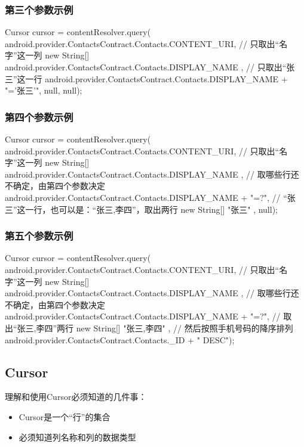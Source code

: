 \subsubsection[第三个参数示例]{第三个参数示例}
\begin{javacode}
Cursor cursor = contentResolver.query(
    android.provider.ContactsContract.Contacts.CONTENT_URI,
    // 只取出“名字”这一列
    new String[]{ android.provider.ContactsContract.Contacts.DISPLAY_NAME },
    // 只取出“张三”这一行
    android.provider.ContactsContract.Contacts.DISPLAY_NAME + "='张三'",
    null,
    null);
\end{javacode}

\subsubsection[第四个参数示例]{第四个参数示例}
\begin{javacode}
Cursor cursor = contentResolver.query(
    android.provider.ContactsContract.Contacts.CONTENT_URI,
    // 只取出“名字”这一列
    new String[]{ android.provider.ContactsContract.Contacts.DISPLAY_NAME },
    // 取哪些行还不确定，由第四个参数决定
    android.provider.ContactsContract.Contacts.DISPLAY_NAME + "=?",
    // “张三”这一行，也可以是：“张三,李四”，取出两行
    new String[]{ "张三" },
    null);
\end{javacode}

\subsubsection[第五个参数示例]{第五个参数示例}
\begin{javacode}
Cursor cursor = contentResolver.query(
    android.provider.ContactsContract.Contacts.CONTENT_URI,
    // 只取出“名字”这一列
    new String[]{ android.provider.ContactsContract.Contacts.DISPLAY_NAME },
    // 取哪些行还不确定，由第四个参数决定
    android.provider.ContactsContract.Contacts.DISPLAY_NAME + "=?",
    // 取出“张三,李四”两行
    new String[]{ "张三,李四" },
    // 然后按照手机号码的降序排列
    android.provider.ContactsContract.Contacts._ID + " DESC");
\end{javacode}

\subsection[Cursor]{Cursor}
理解和使用Cursor必须知道的几件事：\\
\begin{itemize}
\item Cursor是一个“行”的集合
\item 必须知道列名称和列的数据类型
\end{itemize}

